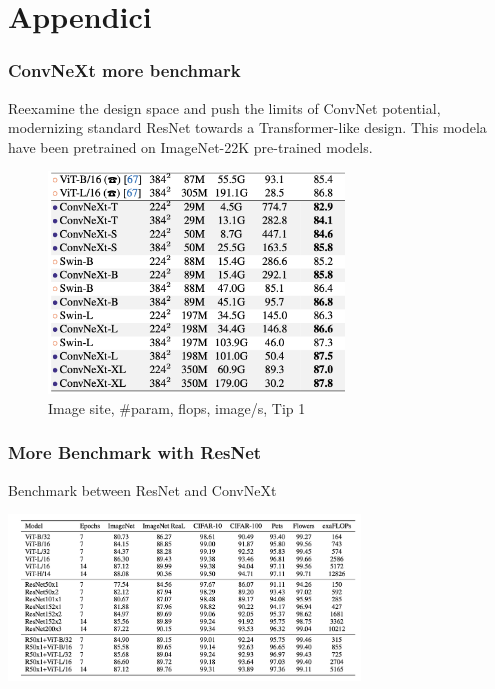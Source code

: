 \section{Appendici}

\begin{frame}
\frametitle{ConvNeXt more benchmark}
Reexamine the design space and push the limits of ConvNet potential, modernizing  standard ResNet towards a Transformer-like design.
This modela have been pretrained on ImageNet-22K pre-trained models.


\begin{figure}[h]
    \centering
    \includegraphics[width=0.7\textwidth]{img/4-section/ConvNext2.png}
    \caption{Image site, #param, flops, image/s, Tip 1}
\end{figure}

\end{frame}


\begin{frame}
\frametitle{More Benchmark with ResNet}
Benchmark between ResNet and ConvNeXt
\begin{center}
    \includegraphics[width=0.7\textwidth]{img/4-section/More-benchmark.png}
\end{center}

\end{frame}

